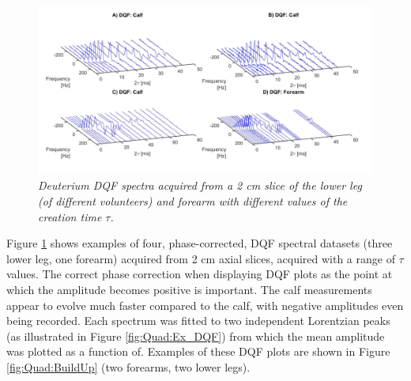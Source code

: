 \documentclass[class=article, crop=false]{standalone}
\begin{document}
\begin{figure}
    \centering
    \includegraphics[width=1\textwidth]{Figures/Quad/Bulk_DQF_1.png}
    \caption{\textit{Deuterium DQF spectra acquired from a 2 cm slice of the lower leg (of different volunteers) and forearm with different values of the creation time $\tau$.}}
    \label{fig:Quad:Bulk_DQF_1}
\end{figure}

Figure \ref{fig:Quad:Bulk_DQF_1} shows examples of four, phase-corrected, DQF spectral datasets (three lower leg, one forearm) acquired from 2 cm axial slices, acquired with a range of $\tau$ values. The correct phase correction when displaying DQF plots as the point at which the amplitude becomes positive is important. The calf measurements appear to evolve much faster compared to the calf, with negative amplitudes even being recorded. Each spectrum was fitted to two independent Lorentzian peaks (as illustrated in Figure \ref{fig:Quad:Ex_DQF}) from which the mean amplitude was plotted as a function of. Examples of these DQF plots are shown in Figure \ref{fig:Quad:BuildUp} (two forearms, two lower legs). 
\end{document}
